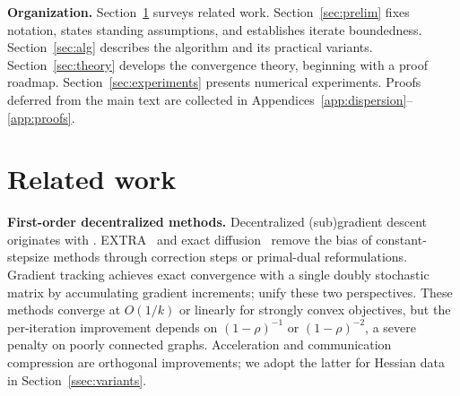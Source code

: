 \documentclass[11pt,a4paper]{article}
\def\cO{O}%
\newcommand{\cO}{\mathcal{O}}
\begin{document}
\smallskip
\noindent\textbf{Organization.}
Section~\ref{sec:related} surveys related work.
Section~\ref{sec:prelim} fixes notation, states standing assumptions,
and establishes iterate boundedness.
Section~\ref{sec:alg} describes the algorithm and its practical variants.
Section~\ref{sec:theory} develops the convergence theory, beginning
with a proof roadmap.
Section~\ref{sec:experiments} presents numerical experiments.
Proofs deferred from the main text are collected in
Appendices~\ref{app:dispersion}--\ref{app:proofs}.

	\section{Related work}\label{sec:related}
	
	\noindent\textbf{First-order decentralized methods.}
	Decentralized (sub)gradient descent originates with
	\citet{nedic2009subgradient}.
	EXTRA~\citep{shi2015extra} and exact
	diffusion~\citep{yuan2019exactdiffusion} remove the bias of
	constant-stepsize methods through correction steps or primal-dual
	reformulations.
	Gradient tracking
	\citep{nedic2017diging,xin2019distributed,pu2021distributed}
	achieves exact convergence with a single doubly stochastic matrix
	by accumulating gradient increments;
	\citet{alghunaim2020decentralized} unify these two perspectives.
	These methods converge at $\cO(1/k)$ or linearly for strongly convex
	objectives, but the per-iteration improvement depends on
	$(1-\rho)^{-1}$ or $(1-\rho)^{-2}$, a severe penalty on poorly
	connected graphs.
	Acceleration \citep{jakovetic2014fast,li2021decentralized} and
	communication compression
	\citep{koloskova2019decentralized,beznosikov2023biased} are
	orthogonal improvements; we adopt the latter for Hessian data
	in Section~\ref{ssec:variants}.
\end{document}

